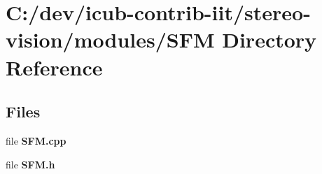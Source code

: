\section{C\+:/dev/icub-\/contrib-\/iit/stereo-\/vision/modules/\+S\+F\+M Directory Reference}
\label{dir_dde556652f18110d5b294adf514896ce}
\subsection*{Files}
\begin{DoxyCompactItemize}
\item 
file {\bfseries S\+F\+M.\+cpp}
\item 
file {\bfseries S\+F\+M.\+h}
\end{DoxyCompactItemize}
